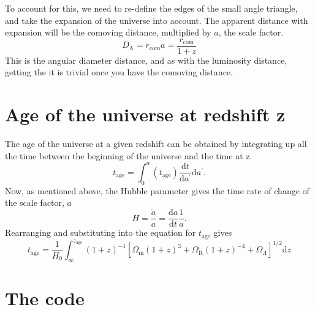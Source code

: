 \documentclass[]{article}
\begin{document}
\noindent To account for this, we need to re-define the edges of the small angle triangle, and take the expansion of the universe into account. The apparent distance with expansion will be the comoving distance, multiplied by $a$, the scale factor. 
\begin{equation}
\boxed{D_\mathrm{A} = r_\mathrm{com} a = \frac{r_\mathrm{com}}{1+z}}
\end{equation}
This is the angular diameter distance, and as with the luminosity distance, getting the it is trivial once you have the comoving distance. 

\section{Age of the universe at redshift z}

The age of the universe at a given redshift can be obtained by integrating up all the time between the beginning of the universe and the time at z. 
\begin{equation}
t_\mathrm{age} = \int_0^a(t_\mathrm{age}) \frac{\mathrm{d}t}{\mathrm{d}a^\prime} \mathrm{d}a^\prime.
\end{equation}
Now, as mentioned above, the Hubble parameter gives the time rate of change of the scale factor, $a$
\begin{equation}
H = \frac{\dot a}{a} = \frac{\mathrm{d}a}{\mathrm{d}t}\frac{1}{a}.
\end{equation}
Rearranging and substituting into the equation for $t_\mathrm{age}$ gives 
\begin{equation}
\boxed{t_\mathrm{age} = \frac{1}{H_0}\int_\infty^{z_\mathrm{age}} (1+z)^{-1} [\Omega_\mathrm{m} (1+z)^{3}+\Omega_\mathrm{R} (1+z)^{-4}+\Omega_\Lambda]^{1/2} \mathrm{d}z}
\label{eq:tage}
\end{equation}

\section{The code}
\end{document}
